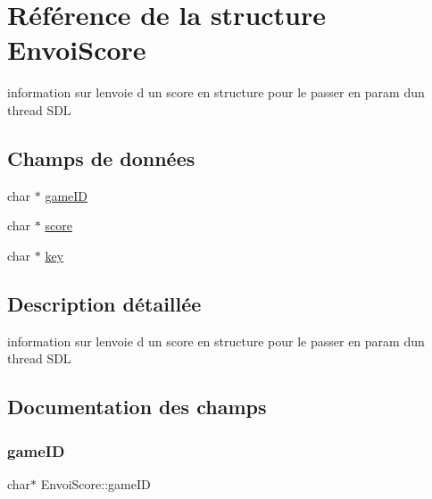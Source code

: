 \hypertarget{struct_envoi_score}{}\section{Référence de la structure Envoi\+Score}
\label{struct_envoi_score}


information sur l\textquotesingle{}envoie d un score en structure pour le passer en param d\textquotesingle{}un thread S\+DL  


\subsection*{Champs de données}
\begin{DoxyCompactItemize}
\item 
char $\ast$ \hyperlink{struct_envoi_score_a1fe79e00ae263f0dfc326296533f51b2}{game\+ID}
\item 
char $\ast$ \hyperlink{struct_envoi_score_a9916e25187448f3c8b8a6c2b5fd05128}{score}
\item 
char $\ast$ \hyperlink{struct_envoi_score_a8f70bcb27121f5e502043b0e43812127}{key}
\end{DoxyCompactItemize}


\subsection{Description détaillée}
information sur l\textquotesingle{}envoie d un score en structure pour le passer en param d\textquotesingle{}un thread S\+DL 

\subsection{Documentation des champs}
\mbox{\label{struct_envoi_score_a1fe79e00ae263f0dfc326296533f51b2}} 
\subsubsection{\texorpdfstring{game\+ID}{gameID}}
{\footnotesize\ttfamily char$\ast$ Envoi\+Score\+::game\+ID}

\mbox{\label{struct_envoi_score_a8f70bcb27121f5e502043b0e43812127}} 
